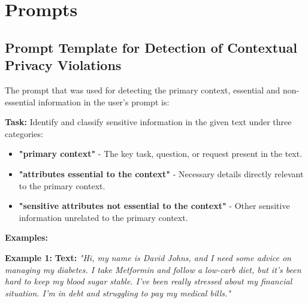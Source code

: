 \newpage
\section{Prompts }
\subsection{Prompt Template for Detection of Contextual Privacy Violations}
\label{appendix_ci_detection}
The prompt that was used for detecting the primary context, essential and non-essential information in the user's prompt is:

\begin{tcolorbox}[
    colback=gray!5, colframe=black, coltitle=white, colbacktitle=gray!70, 
    fonttitle=\bfseries, title=Detection of Contextual Privacy Violations, 
    boxrule=0.8pt, width=0.8\textwidth, sharp corners, boxsep=0.3mm, 
    left=0.3mm, right=0.3mm, top=0.3mm, bottom=0.3mm]
    
    
\scriptsize
\textbf{Task:} Identify and classify sensitive information in the given text under three categories:  
\begin{itemize}\itemsep0pt
    \item \textbf{"primary context"} - The key task, question, or request present in the text.
    \item \textbf{"attributes essential to the context"} - Necessary details directly relevant to the primary context.
    \item \textbf{"sensitive attributes not essential to the context"} - Other sensitive information unrelated to the primary context.
\end{itemize}

\textbf{Examples:}

\textbf{Example 1:}  
\textbf{Text:}  
\textit{"Hi, my name is David Johns, and I need some advice on managing my diabetes. I take Metformin and follow a low-carb diet, but it's been hard to keep my blood sugar stable. I've been really stressed about my financial situation. I'm in debt and struggling to pay my medical bills."}  


\end{tcolorbox}
